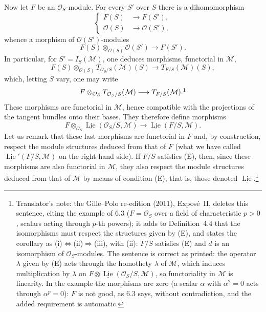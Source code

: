 Now let \(F\) be an \(\mathcal O_S\)-module. For every \(S'\) over \(S\)
there is a dihomomorphism
\[
 \left\{
 \begin{aligned}
   F(S)&\longrightarrow F(S'),\\
   \mathcal O(S)&\longrightarrow\mathcal O(S'),
 \end{aligned}
 \right.
\]
whence a morphism of \(\mathcal O(S')\)-modules
\[
 F(S)\otimes_{\mathcal O(S)}\mathcal O(S')\longrightarrow F(S').
\]
In particular, for \(S'=I_S(\mathcal M)\), one deduces morphisms,
functorial in \(\mathcal M\),
\[
 F(S)\otimes_{\mathcal O(S)}T_{\mathcal O_S/S}(\mathcal M)(S)
 \longrightarrow T_{F/S}(\mathcal M)(S),
\]
which, letting \(S\) vary, one may write
\[
 F\otimes_{\mathcal O_S}T_{\mathcal O_S/S}(\mathcal M)
 \longrightarrow T_{F/S}(\mathcal M).\footnotemark
\]
These morphisms are functorial in \(\mathcal M\), hence compatible with the
projections of the tangent bundles onto their bases. They therefore define
morphisms
\[
 F\otimes_{\mathcal O_S}
 \underline{\operatorname{Lie}}(\mathcal O_S/S,\mathcal M)
 \longrightarrow
 \underline{\operatorname{Lie}}(F/S,\mathcal M).
\]
Let us remark that these last morphisms are functorial in \(F\) and, by
construction, respect the module structures deduced from that of \(F\)
(what we have called \(\underline{\operatorname{Lie}}'(F/S,\mathcal M)\) on
the right-hand side). If \(F/S\) satisfies (E), then, since these
morphisms are also functorial in \(\mathcal M\), they also respect the
module structures deduced from that of \(\mathcal M\) by means of condition
(E), that is, those denoted \(\underline{\operatorname{Lie}}\).\footnote{Translator's
note: the Gille--Polo re-edition (2011), Expos\'e~II, deletes this
sentence, citing the example of 6.3 (\(F=\mathcal O_S\) over a field of
characteristic \(p>0\), scalars acting through \(p\)-th powers); it adds to
Definition~4.4 that the isomorphisms must respect the structures given by
(E), and states the corollary as (i)\(\Leftrightarrow\)(ii)\(\Rightarrow\)(iii),
with (ii): \(F/S\) satisfies (E) and \(d\) is an isomorphism of
\(\mathcal O_S\)-modules. The sentence is correct as printed: the operator
\(\lambda\) given by (E) acts through the homothety \(\lambda\) of
\(\mathcal M\), which induces multiplication by \(\lambda\) on
\(F\otimes\underline{\operatorname{Lie}}(\mathcal O_S/S,\mathcal M)\), so
functoriality in \(\mathcal M\) is linearity. In the example the morphisms
are zero (a scalar \(\alpha\) with \(\alpha^2=0\) acts through
\(\alpha^p=0\)): \(F\) is not good, as 6.3 says, without contradiction, and
the added requirement is automatic.}


